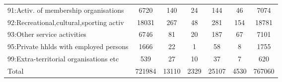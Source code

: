 {\begin{longtable}{l*{6}{c}}
91:Activ. of membership organisations&     6720&      140&       24&      144&       46&     7074\\
92:Recreational,cultural,sporting activ&    18031&      267&       48&      281&      154&    18781\\
93:Other service activities&     6746&       81&       20&      187&       67&     7101\\
95:Private hhlds with employed persons&     1666&       22&        1&       58&        8&     1755\\
99:Extra-territorial organisations etc&      539&       27&       10&       37&        7&      620\\
Total     &   721984&    13110&     2329&    25107&     4530&   767060\\
\hline\hline
\end{longtable}
}
